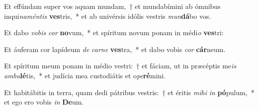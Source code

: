 \item Et effúndam super vos aquam mundam,~† et mundabímini ab ómnibus inqui\textit{na}\textit{mén}\textit{tis} \textbf{ves}tris,~* et ab univérsis idólis vestris \textit{mun}\textbf{dá}bo vos.
\item Et dabo \textit{vo}\textit{bis} \textit{cor} \textbf{no}vum,~* et spíritum novum ponam in médi\textit{o} \textbf{ves}tri:
\item Et áuferam cor lapídeum \textit{de} \textit{car}\textit{ne} \textbf{ves}tra,~* et dabo vobis \textit{cor} \textbf{cár}neum.
\item Et spíritum meum ponam in médio vestri:~† et fáciam, ut in præcéptis me\textit{is} \textit{am}\textit{bu}\textbf{lé}tis,~* et judícia mea custodiátis et o\textit{pe}\textbf{ré}mini.
\item Et habitábitis in terra, quam dedi pátribus vestris:~† et éritis \textit{mi}\textit{hi} \textit{in} \textbf{pó}pulum,~* et ego ero vobis \textit{in} \textbf{De}um.
